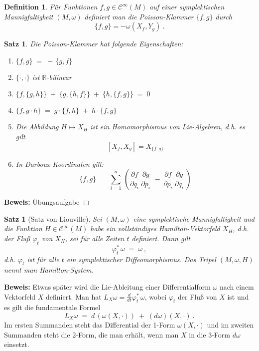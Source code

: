 \documentclass[12pt,a4paper]{article}
\def\R{\mathbb{R}}
\newtheorem{Satz}[Lemma]{Satz}
\newtheorem{Definition}[Lemma]{Definition}
\def\proof{\noindent\textbf{Beweis:}\quad}
\def\qed{\quad\hfill\ensuremath{\Box}}
\begin{document}
\begin{Definition}
F\"ur Funktionen $f,g \in \mathcal C^\infty(M)$ auf einer symplektischen Mannigfaltigkeit
$(M, \omega)$ definiert man die {\em Poisson-Klammer} $\{f, g\}$ durch
$$
\{f, g\} = - \omega(X_f, Y_g) \ .
$$
\end{Definition}

\bigskip

\begin{Satz}\label{poisson}
Die Poisson-Klammer hat folgende Eigenschaften:
\begin{enumerate}
\item
$
\{f, g\} \;= \;-\,\{g, f\}
$
\item
$ \{ \cdot, \cdot\}$ ist $\R$-bilinear
\item
$
\{ f, \{g, h\}\} \;+\; \{g, \{h, f\}\} \;+\; \{h, \{f, g\}\} \;=\; 0
$
\item
$
\{f, g \cdot h\} \;=\; g \cdot \{ f, h\} \;+\;  h \cdot \{f, g\}
$
\item
Die Abbildung $H \mapsto X_H$ ist ein Homomorphismus von Lie-Algebren, d.h. es gilt
$$
[X_f, X_g] = X_{\{f,g\}}
$$
\item
In Darboux-Koordinaten gilt:
$$
\{f, g\} \;=\; \sum_{i=1}^n \, \left(
\frac{\partial f}{\partial q_i}\,  \frac{\partial g}{\partial p_i}\,
\,-\,
\frac{\partial f}{\partial p_i}\,  \frac{\partial g}{\partial q_i}\,
\right)
$$
\end{enumerate}
\end{Satz}
\proof
\"Ubungsaufgabe
\qed

\bigskip

\begin{Satz}[Satz von Liouville]
Sei $(M, \omega)$ eine symplektische Mannigfaltigkeit und die Funktion $H \in \mathcal C^\infty(M)$ habe ein
vollst\"andiges Hamilton-Vektorfeld $X_H$, d.h. der Flu\ss{} $\varphi_t$ von $X_H$, sei f\"ur
alle Zeiten $t$ definiert. Dann  gilt
$$
\varphi^*_t \,\omega \;=\; \omega \ ,
$$
d.h. $\varphi_t$ ist f\"ur alle $t$ ein symplektischer Diffeomorphismus. Das Tripel
$(M, \omega, H)$ nennt man {\em Hamilton-System}.
\end{Satz}
\proof
Etwas sp\"ater wird die Lie-Ableitung einer Differentialform $\omega$ nach einem Vektorfeld $X$ definiert. Man hat
$L_X \omega = \frac{d}{dt} \varphi_t^*\,\omega$, wobei $\varphi_t$ der Flu\ss{} von $X$ ist und es gilt die
fundamentale Formel
$$
L_X \omega \;=\; d \, (\omega(X,\cdot)) \;+\; (d\omega) (X, \cdot) \ .
$$
Im ersten Summanden steht das Differential der 1-Form $\omega(X,\cdot)$ und im zweiten Summanden steht
die 2-Form, die man erh\"alt, wenn man $X$ in die 3-Form $d\omega$ einsetzt.
\end{document}
